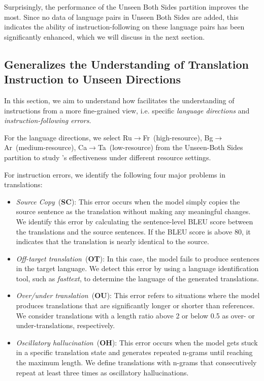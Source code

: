 Surprisingly, the performance of the Unseen Both Sides partition improves the most. Since no data of language pairs in Unseen Both Sides are added, this indicates the ability of instruction-following on these language pairs has been significantly enhanced, which we will discuss in the next section.






\subsection{\method Generalizes the Understanding of Translation Instruction to Unseen Directions}
\label{sec:translation_behavior}


In this section, we aim to understand how \method facilitates the understanding of instructions from a more fine-grained view, i.e. specific \textit{language directions} and \textit{instruction-following errors}. 

For the language directions, we select Ru$\to$Fr~(high-resource), Bg$\to$Ar~(medium-resource), Ca$\to$Ta~(low-resource) from the Unseen-Both Sides partition to study \methodend's effectiveness under different resource settings. 

For instruction errors, we identify the following four major problems in translations:




\begin{itemize}

    \item \textit{Source Copy}~(\textbf{SC}): This error occurs when the model simply copies the source sentence as the translation without making any meaningful changes. We identify this error by calculating the sentence-level BLEU score between the translations and the source sentences. If the BLEU score is above 80, it indicates that the translation is nearly identical to the source.

    \item \textit{Off-target translation}~(\textbf{OT}): In this case, the model fails to produce sentences in the target language. We detect this error by using a language identification tool, such as \textit{fasttext}, to determine the language of the generated translations.

    \item \textit{Over/under translation}~(\textbf{OU}): This error refers to situations where the model produces translations that are significantly longer or shorter than references. We consider translations with a length ratio above 2 or below 0.5 as over- or under-translations, respectively.

    \item \textit{Oscillatory hallucination}~(\textbf{OH}): This error occurs when the model gets stuck in a specific translation state and generates repeated n-grams until reaching the maximum length. We define translations with n-grams that consecutively repeat at least three times as oscillatory hallucinations.
\end{itemize}



